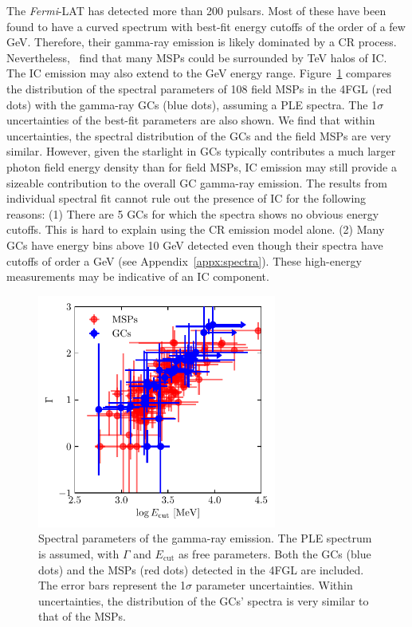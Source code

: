\documentclass[doublespace,nopageskip]{VTthesis} %
\begin{document}
The \textit{Fermi}-LAT has detected more than 200 pulsars. Most of these have been found to have a curved spectrum with best-fit energy cutoffs of the order of a few GeV. Therefore, their gamma-ray emission is likely dominated by a CR process. {Nevertheless,~\citet{2018PhRvD..98d3005H,2021arXiv210400014H} find} that many MSPs could be surrounded by TeV halos of IC. The IC emission may also extend to the GeV energy range. Figure~\ref{fig:msps} compares the distribution of the spectral parameters of 108 field MSPs in the 4FGL (red dots) with the gamma-ray GCs (blue dots), assuming a PLE spectra. The 1$\sigma$ uncertainties of the best-fit parameters are also shown. We find that within uncertainties, the spectral distribution of the GCs and the field MSPs are very similar. However, given the starlight in GCs typically contributes a much larger photon field energy density than for field MSPs, IC emission may still provide a sizeable contribution to the overall GC gamma-ray emission. The results from individual spectral fit cannot rule out the presence of IC for the following reasons: (1) There are 5 GCs for which the spectra shows no obvious energy cutoffs. This is hard to explain using the CR emission model alone. (2) Many GCs have energy bins above 10 GeV detected even though their spectra have cutoffs of order a GeV (see Appendix~\ref{appx:spectra}). These high-energy measurements may be indicative of an IC component.

\begin{figure}[htb]
    \centering
    \includegraphics[width=0.7\textwidth]{Figures/Globular/msp_vs_gc.pdf}
    \caption{Spectral parameters of the gamma-ray emission. The PLE spectrum is assumed, with $\Gamma$ and $E_\mathrm{cut}$ as free parameters. Both the GCs (blue dots) and the MSPs (red dots) detected in the 4FGL are included. The error bars represent the 1$\sigma$ parameter uncertainties. Within uncertainties, the distribution of the GCs' spectra is very similar to that of the MSPs.}
    \label{fig:msps}
\end{figure}
\end{document}
